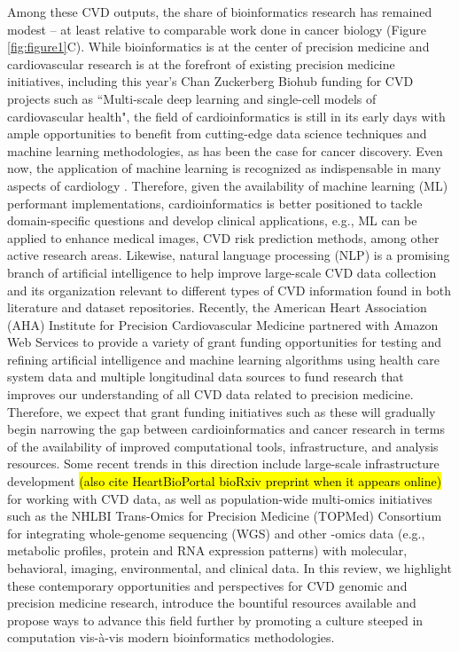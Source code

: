 \documentclass[letter]{bioinfo}
\begin{document}
Among these CVD outputs, the share of bioinformatics research has remained modest -- at least relative to comparable work done in cancer biology (Figure \ref{fig:figure1}C). While bioinformatics is at the center of precision medicine \citep{Gomez-Lopez:2017:Precision} and cardiovascular research is at the forefront of existing precision medicine initiatives, including this year's Chan Zuckerberg Biohub funding for CVD projects such as ``Multi-scale deep learning and single-cell models of cardiovascular health", the field of cardioinformatics is still in its early days with ample opportunities to benefit from cutting-edge data science techniques and machine learning methodologies, as has been the case for cancer discovery.  Even now, the application of machine learning is recognized as indispensable in many aspects of cardiology \citep{Shameer:2017:Translational,Shameer:2018:Machine}. Therefore, given the availability of machine learning (ML) performant implementations, cardioinformatics is better positioned to tackle domain-specific questions and develop clinical applications, e.g., ML can be applied to enhance medical images, CVD risk prediction methods, among other active research areas. Likewise, natural language processing (NLP) is a promising branch of artificial intelligence to help improve large-scale CVD data collection and its organization relevant to different types of CVD information found in both literature and dataset repositories.  Recently, the American Heart Association (AHA) Institute for Precision Cardiovascular Medicine partnered with Amazon Web Services to provide a variety of grant funding opportunities for testing and refining artificial intelligence and machine learning algorithms using health care system data and multiple longitudinal data sources to fund research that improves our understanding of all CVD data related to precision medicine.  Therefore, we expect that grant funding initiatives such as these will gradually begin narrowing the gap between cardioinformatics and cancer research in terms of the availability of improved computational tools, infrastructure, and analysis resources.  Some recent trends in this direction include large-scale infrastructure development \citep{Kass-Hout:2018:American} \hl{(also cite HeartBioPortal bioRxiv preprint when it appears online)} for working with CVD data, as well as population-wide multi-omics initiatives such as the NHLBI Trans-Omics for Precision Medicine (TOPMed) Consortium for integrating whole-genome sequencing (WGS) and other -omics data (e.g., metabolic profiles, protein and RNA expression patterns) with molecular, behavioral, imaging, environmental, and clinical data.  In this review, we highlight these contemporary opportunities and perspectives for CVD genomic and precision medicine research, introduce the bountiful resources available and propose ways to advance this field further by promoting a culture steeped in computation vis-\`{a}-vis modern bioinformatics methodologies.
\end{document}
